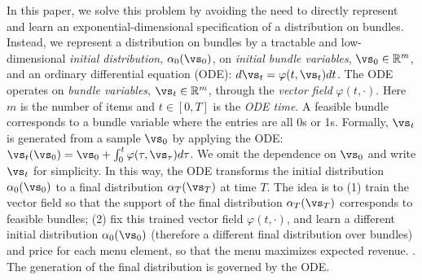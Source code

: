 %

In this paper, we solve this problem by avoiding the need to directly represent and learn an exponential-dimensional specification of a distribution on bundles. Instead, we represent a distribution on bundles by a tractable and low-dimensional \emph{initial distribution}, $\alpha_0(\vs_0)$, on {\em initial bundle variables}, $\vs_0\in \mathbb{R}^m$,
and an ordinary differential equation (ODE): $d\vs_t = \varphi(t, \vs_t) dt$. The ODE operates on \emph{bundle variables}, $\vs_t\in\mathbb{R}^m$, through the {\em vector field} $\varphi(t, \cdot)$. Here $m$ is the number of items and $t\in[0,T]$ is the {\em ODE time}. A feasible bundle corresponds to a bundle variable where the entries are all 0s or 1s. Formally, $\vs_t$ is generated from a sample $\vs_0$ by applying the ODE: $\vs_t(\vs_0)=\vs_0+\int_0^t \varphi(\tau,\vs_\tau) d\tau$. We omit the dependence on $\vs_0$ and write $\vs_t$ for simplicity.
In this way, the ODE transforms the initial distribution $\alpha_0(\vs_0)$ to a final distribution $\alpha_T(\vs_T)$ at time $T$. The idea is to (1) train the vector field so that the support of the final distribution $\alpha_T(\vs_T)$ corresponds to feasible bundles; (2) fix this trained vector field $\varphi(t, \cdot)$, and learn a different initial distribution $\alpha_0(\vs_0)$ (therefore a different final distribution over bundles) and price for each menu
element, so that the menu maximizes expected revenue. 
.
The generation of the final distribution is governed by the ODE. 
\fi


